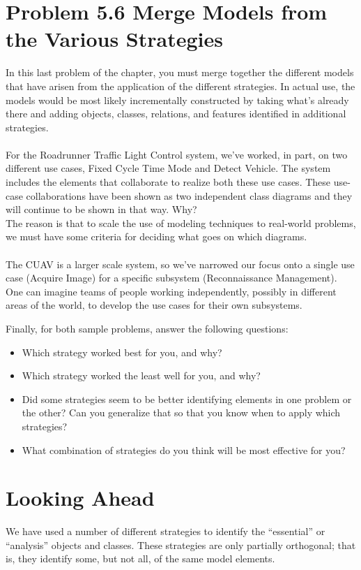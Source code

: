 \documentclass[12pt,a4paper]{article}
\begin{document}
\section{Problem 5.6 Merge Models from the Various Strategies}
In this last problem of the chapter, you must merge together the different models that
have arisen from the application of the different strategies. In actual use, the models
would be most likely incrementally constructed by taking what’s already there and adding objects, classes, relations, and features identified in additional strategies. \\ \\
For the Roadrunner Traffic Light Control system, we’ve worked, in part, on
two different use cases, Fixed Cycle Time Mode and Detect Vehicle. The system
includes the elements that collaborate to realize both these use cases. These use-case
collaborations have been shown as two independent class diagrams and they will
continue to be shown in that way. Why? \\ The reason is that to scale the use of modeling techniques to real-world problems,
we must have some criteria for deciding what goes on which diagrams. \\ \\

The CUAV is a larger scale system, so we’ve narrowed our focus onto a single use
case (Acquire Image) for a specific subsystem (Reconnaissance Management). One
can imagine teams of people working independently, possibly in different areas of
the world, to develop the use cases for their own subsystems.

Finally, for both sample problems, answer the following questions:
\begin{itemize}
\item Which strategy worked best for you, and why?
\item Which strategy worked the least well for you, and why?
\item Did some strategies seem to be better identifying elements in one problem or the
other? Can you generalize that so that you know when to apply which strategies?
\item What combination of strategies do you think will be most effective for you?
\end{itemize}

\section{Looking Ahead}
We have used a number of different strategies to identify the “essential” or “analysis”
objects and classes. These strategies are only partially orthogonal; that is, they identify
some, but not all, of the same model elements. \\
\end{document}
